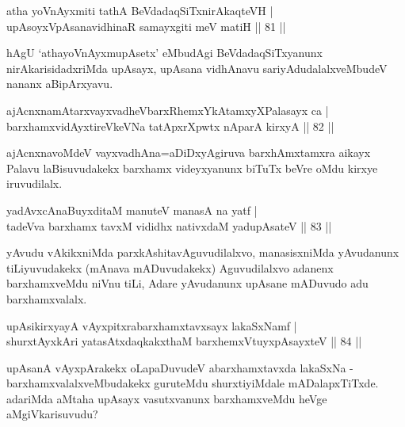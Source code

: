 \begin{shl}
atha yoV\s nAyxmiti tathA BeVdadaqSiTxnirAkaqteVH |\\
upAsoyxVpAsanavidhinaR samayxgiti meV matiH \hfill || 81 ||
\end{shl}

\begin{artha}
hAgU `athayoV\s nAyxmupAsetx' eMbudAgi BeVdadaqSiTxyanunx nirAkarisidadxriMda upAsayx, upAsana vidhAnavu sariyAdudalalxveMbudeV nananx aBipArxyavu.
\end{artha}

\begin{shl}
ajAcnxnamAtarxvayxvadheVbarxRhemxYkAtamxyXPalasayx ca |\\
barxhamxvidAyxtireVkeVNa tatApxrXpwtx nAparA kirxyA \hfill || 82 ||
\end{shl}

\begin{artha}
ajAcnxnavoMdeV vayxvadhAna=aDiDxyAgiruva barxhAmxtamxra aikayx Palavu \-laBisuvudakekx barxhamx videyxyanunx biTuTx beVre oMdu kirxye iruvudilalx.
\end{artha}

  
  \begin{shl}
yadAvxcA\s naBuyxditaM manuteV manasA na yatf |\\
tadeVva barxhamx tavxM vididhx  nativxdaM yadupAsateV \hfill || 83 ||
\end{shl}

\begin{artha}
yAvudu vAkikxniMda parxkAshitavAguvudilalxvo, manasisxniMda yAvudanunx tiLiyuvudakekx (mAnava mADuvudakekx) Aguvudilalxvo adanenx barxhamxveMdu niVnu tiLi, Adare yAvudanunx upAsane mADuvudo adu barxhamxvalalx.
\end{artha}

\begin{shl}
upAsikirxyayA vAyxpitxrabarxhamxtavxsayx lakaSxNamf |\\
shurxtAyx\s kAri yatasAtxdaqkakxthaM barxhemxVtuyxpAsayxteV \hfill || 84 ||
\end{shl}

\begin{artha}
upAsanA vAyxpArakekx oLapaDuvudeV abarxhamxtavxda lakaSxNa - barxhamxvalalxveMbudakekx guruteMdu shurxtiyiMdale mADalapxTiTxde. adariMda aMtaha upAsayx vasutxvanunx barxhamxveMdu heVge aMgiVkarisuvudu?
\end{artha}

